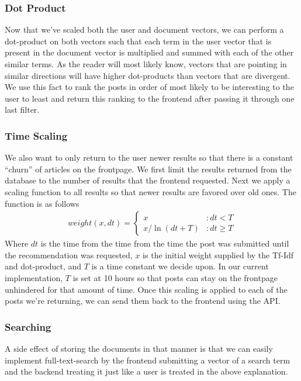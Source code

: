 \documentclass[11pt,letterpaper,titlepage]{article}
\begin{document}
\subsubsection{Dot Product}
Now that we've scaled both the user and document vectors, we can perform a
dot-product on both vectors such that each term in the user vector that is
present in the document vector is multiplied and summed with each of the other
similar terms.  As the reader will most likely know, vectors that are pointing
in similar directions will have higher dot-products than vectors that are
divergent.  We use this fact to rank the posts in order of most likely to be
interesting to the user to least and return this ranking to the frontend after
passing it through one last filter.
\subsubsection{Time Scaling}
We also want to only return to the user newer results so that there is a
constant ``churn'' of articles on the frontpage.  We first limit the results
returned from the database to the number of results that the frontend requested.
Next we apply a scaling function to all results so that newer results are
favored over old ones.  The function is as follows
\begin{align}
weight(x, dt) = \left\{
     \begin{array}{lr}
       x & : dt < T\\
      x / \ln{(dt + T)} & : dt \geq T
     \end{array}
   \right.
\end{align}
Where $dt$ is the time from the time from the time the post was submitted until
the recommendation was requested, $x$ is the initial weight supplied by the
Tf-Idf and dot-product, and $T$ is a time constant we decide upon.  In our
current implementation, $T$ is set at 10 hours so that posts can stay on the
frontpage unhindered for that amount of time. Once this scaling is applied to
each of the posts we're returning, we can send them back to the frontend using
the API.
\subsubsection{Searching}
A side effect of storing the documents in that manner is that we can easily
implement full-text-search by the frontend submitting a vector of a search term
and the backend treating it just like a user is treated in the above
explanation.
\end{document}
